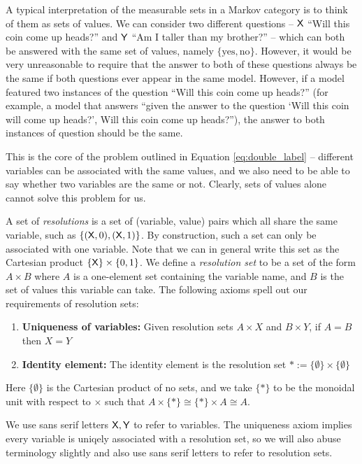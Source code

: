 A typical interpretation of the measurable sets in a Markov category is to think of them as sets of values. We can consider two different questions -- $\mathsf{X}$ ``Will this coin come up heads?'' and $\mathsf{Y}$ ``Am I taller than my brother?'' -- which can both be answered with the same set of values, namely $\{\text{yes},\text{no}\}$. However, it would be very unreasonable to require that the answer to both of these questions always be the same if both questions ever appear in the same model. However, if a model featured two instances of the question ``Will this coin come up heads?'' (for example, a model that answers ``given the answer to the question `Will this coin will come up heads?', Will this coin come up heads?''), the answer to both instances of question should be the same.

This is the core of the problem outlined in Equation \ref{eq:double_label} -- different variables can be associated with the same values, and we also need to be able to say whether two variables are the same or not. Clearly, sets of values alone cannot solve this problem for us.

A set of \emph{resolutions} is a set of (variable, value) pairs which all share the same variable, such as $\{(\mathsf{X},0),(\mathsf{X},1)\}$. By construction, such a set can only be associated with one variable. Note that we can in general write this set as the Cartesian product $\{\mathsf{X}\}\times \{0,1\}$. We define a \emph{resolution set} to be a set of the form $A\times B$ where $A$ is a one-element set containing the variable name, and $B$ is the set of values this variable can take. The following axioms spell out our requirements of resolution sets:

\begin{enumerate}
	\item \textbf{Uniqueness of variables:} Given resolution sets $A\times X$ and $B\times Y$, if $A=B$ then $X=Y$
	\item \textbf{Identity element:} The identity element is the resolution set $*:=\{\emptyset\}\times\{\emptyset\}$
\end{enumerate}

Here $\{\emptyset\}$ is the Cartesian product of no sets, and we take $\{*\}$ to be the monoidal unit with respect to $\times$ such that $A\times\{*\}\cong\{*\}\times A \cong A$.

We use sans serif letters $\mathsf{X},\mathsf{Y}$ to refer to variables. The uniqueness axiom implies every variable is uniqely associated with a resolution set, so we will also abuse terminology slightly and also use sans serif letters to refer to resolution sets.

